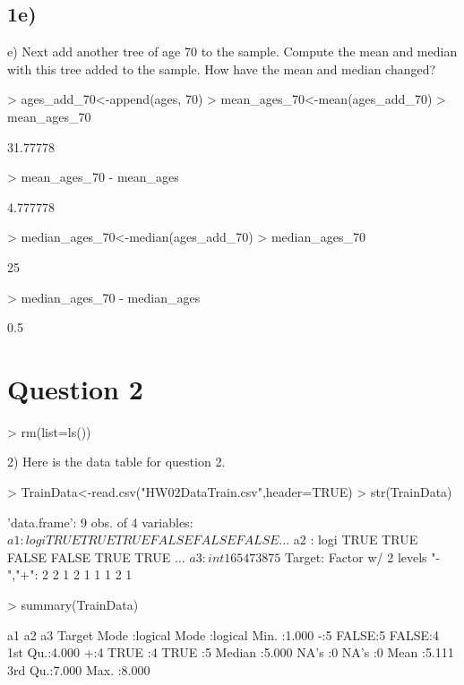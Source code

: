 \documentclass{article}
\begin{document}
\subsection*{1e)}
e) Next add another tree of age 70 to the sample. Compute the mean and
median with this tree added to the sample. How have the mean and
median changed?
\begin{Schunk}
\begin{Sinput}
> ages_add_70<-append(ages, 70)
> mean_ages_70<-mean(ages_add_70)
> mean_ages_70
\end{Sinput}
\begin{Soutput}
[1] 31.77778
\end{Soutput}
\begin{Sinput}
> mean_ages_70 - mean_ages
\end{Sinput}
\begin{Soutput}
[1] 4.777778
\end{Soutput}
\begin{Sinput}
> median_ages_70<-median(ages_add_70)
> median_ages_70
\end{Sinput}
\begin{Soutput}
[1] 25
\end{Soutput}
\begin{Sinput}
> median_ages_70 - median_ages
\end{Sinput}
\begin{Soutput}
[1] 0.5
\end{Soutput}
\end{Schunk}

\section*{Question 2}

\begin{Schunk}
\begin{Sinput}
> rm(list=ls())
\end{Sinput}
\end{Schunk}

2) Here is the data table for question 2.
\begin{Schunk}
\begin{Sinput}
> TrainData<-read.csv("HW02DataTrain.csv",header=TRUE)
> str(TrainData)
\end{Sinput}
\begin{Soutput}
'data.frame':	9 obs. of  4 variables:
 $ a1    : logi  TRUE TRUE TRUE FALSE FALSE FALSE ...
 $ a2    : logi  TRUE TRUE FALSE FALSE TRUE TRUE ...
 $ a3    : int  1 6 5 4 7 3 8 7 5
 $ Target: Factor w/ 2 levels "-","+": 2 2 1 2 1 1 1 2 1
\end{Soutput}
\begin{Sinput}
> summary(TrainData)
\end{Sinput}
\begin{Soutput}
     a1              a2                a3        Target
 Mode :logical   Mode :logical   Min.   :1.000   -:5   
 FALSE:5         FALSE:4         1st Qu.:4.000   +:4   
 TRUE :4         TRUE :5         Median :5.000         
 NA's :0         NA's :0         Mean   :5.111         
                                 3rd Qu.:7.000         
                                 Max.   :8.000         
\end{Soutput}
\end{Schunk}
\end{document}
